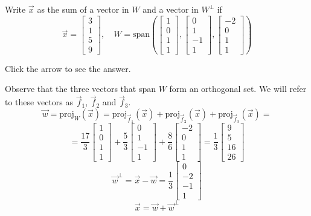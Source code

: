 \documentclass{ximera}
\begin{document}
\begin{problem}\label{OrthoDecomp3}  Write $\vec{x}$ as the sum of a vector in $W$ and a vector in $W^\perp$ if
$$\vec{x} = \begin{bmatrix}3\\ 1\\ 5\\ 9\end{bmatrix}, \quad W = \mbox{span}\left(\begin{bmatrix}1\\ 0\\ 1\\ 1\end{bmatrix}, \begin{bmatrix}0\\ 1\\ -1\\ 1\end{bmatrix}, \begin{bmatrix}-2\\ 0\\ 1\\ 1\end{bmatrix}\right)$$

Click the arrow to see the answer.
\begin{expandable}{}{}
Observe that the three vectors that span $W$ form an orthogonal set.  We will refer to these vectors as $\vec{f}_1$, $\vec{f}_2$ and $\vec{f}_3$.
$$\vec{w}=\text{proj}_W(\vec{x})=\text{proj}_{\vec{f}_1}(\vec{x})+\text{proj}_{\vec{f}_2}(\vec{x})+\text{proj}_{\vec{f}_3}(\vec{x})=$$
$$=\frac{17}{3}\begin{bmatrix}1\\0\\1\\1\end{bmatrix}+\frac{5}{3}\begin{bmatrix}0\\1\\-1\\1\end{bmatrix}+\frac{8}{6}\begin{bmatrix}-2\\0\\1\\1\end{bmatrix}=\frac{1}{3}\begin{bmatrix}9\\5\\16\\26\end{bmatrix}$$
$$\vec{w}^{\perp}=\vec{x}-\vec{w}=\frac{1}{3}\begin{bmatrix}0\\-2\\-1\\1\end{bmatrix}$$
$$\vec{x}=\vec{w}+\vec{w}^{\perp}$$
\end{expandable}
\end{problem}
\end{document}
